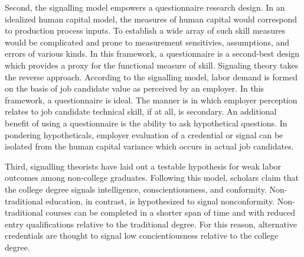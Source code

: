 \documentclass[review]{elsarticle}
\begin{document}
Second, the signalling model empowers a questionnaire research design.
In an idealized human capital model, the measures of human capital would correspond to production process inputs.
To establish a wide array of such skill measures would be complicated and prone to measurement sensitivies, assumptions, and errors of various kinds.
In this framework, a questionnaire is a second-best design which provides a proxy for the functional measure of skill.
Signaling theory takes the reverse approach.
According to the signalling model, labor demand is formed on the basis of job candidate value as perceived by an employer.
In this framework, a questionnaire is ideal.
The manner is in which employer perception relates to job candidate technical skill, if at all, is secondary.
An additional benefit of using a questionnaire is the ability to ask hypothetical questions.
In pondering hypotheticals, employer evaluation of a credential or signal can be isolated from the human capital variance which occurs in actual job candidates.

Third, signalling theorists have laid out a testable hypothesis for weak labor outcomes among non-college graduates.
Following this model, scholars claim that the college degree signals intelligence, conscientiousness, and conformity\cite{caplan2018case}.
Non-traditional education, in contrast, is hypothesized to signal nonconformity.
Non-traditional courses can be completed in a shorter span of time and with reduced entry qualifications relative to the traditional degree.
For this reason, alternative credentials are thought to signal low concientiousness relative to the college degree.


\end{document}
